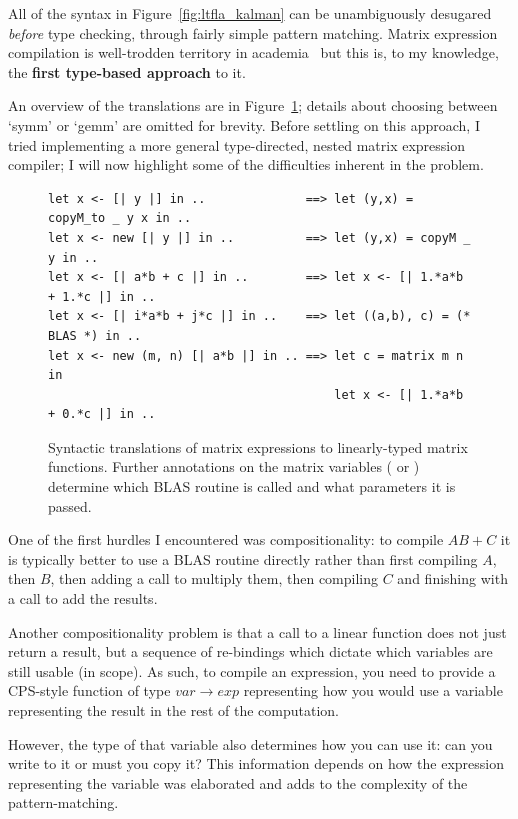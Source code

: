 All of the syntax in Figure~\ref{fig:ltfla_kalman} can be unambiguously
desugared \emph{before} type checking, through fairly simple pattern matching.
Matrix expression compilation is well-trodden territory in
academia~\cite{rocklin_thesis, fabregat_thesis, gunnels_flame, linnea, taco}
but this is, to my knowledge, the \textbf{first type-based approach} to it.

An overview of the translations are in Figure~\ref{fig:mat_patterns}; details
about choosing between `symm' or `gemm' are omitted for brevity. Before
settling on this approach, I tried implementing a more general type-directed,
nested matrix expression compiler; I will now highlight some of the
difficulties inherent in the problem.

\begin{figure}[tp]
    \centering
    \begin{verbatim}
let x <- [| y |] in ..              ==> let (y,x) = copyM_to _ y x in ..
let x <- new [| y |] in ..          ==> let (y,x) = copyM _ y in ..
let x <- [| a*b + c |] in ..        ==> let x <- [| 1.*a*b + 1.*c |] in ..
let x <- [| i*a*b + j*c |] in ..    ==> let ((a,b), c) = (* BLAS *) in ..
let x <- new (m, n) [| a*b |] in .. ==> let c = matrix m n in
                                        let x <- [| 1.*a*b + 0.*c |] in ..
    \end{verbatim}
    \caption{Syntactic translations of matrix expressions to linearly-typed
        matrix functions. Further annotations on the matrix variables
        ( or ) determine which BLAS routine is called and
        what parameters it is passed.}\label{fig:mat_patterns}

\end{figure}

One of the first hurdles I encountered was compositionality: to compile $AB +
C$ it is typically better to use a BLAS routine directly rather than first
compiling $A$, then $B$, then adding a call to multiply them, then compiling
$C$ and finishing with a call to add the results.

Another compositionality problem is that a call to a linear function does not
just return a result, but a sequence of re-bindings which dictate which
variables are still usable (in scope).  As such, to compile an expression, you
need to provide a CPS-style function of type $var \rightarrow exp$ representing
how you would use a variable representing the result in the rest of the
computation.

However, the type of that variable also determines how you can use it: can you
write to it or must you copy it? This information depends on how the expression
representing the variable was elaborated and adds to the complexity of the
pattern-matching.

